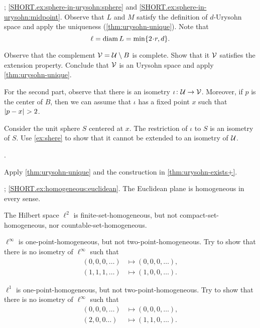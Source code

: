 


\parbf{\ref{ex:sphere-in-urysohn}}; \ref{SHORT.ex:sphere-in-urysohn:sphere} and \ref{SHORT.ex:sphere-in-urysohn:midpoint}.
Observe that $L$ and $M$ satisfy the definition of $d$-Urysohn space and apply the uniqueness (\ref{thm:urysohn-unique}).
Note that
\[\ell=\diam L=\min\{2\cdot r, d\}.\]


Observe that the complement $\mathcal{V}=\mathcal{U}\setminus B$ is complete.
Show that it $\mathcal{V}$ satisfies the extension property.
Conclude that $\mathcal{V}$ is an Urysohn space and apply \ref{thm:urysohn-unique}.

For the second part, observe that there is an isometry $\iota\colon\mathcal{U}\to \mathcal{V}$.
Moreover, if $p$ is the center of $B$, then we can assume that $\iota$ has a fixed point $x$ such that $\dist{p}{x}{}>2$.

Consider the unit sphere $S$ centered at $x$.
The restriction of $\iota$ to $S$ is an isometry of $S$.
Use \ref{ex:shere} to show that it cannot be extended to an isometry of $\mathcal{U}$.

 \cite[Sec. 4.4]{melleray}.

Apply \ref{thm:urysohn-unique} and the construction in \ref{thm:urysohn-exists+}.

\parbf{\ref{ex:homogeneous}}; \ref{SHORT.ex:homogeneous:euclidean}.
The Euclidean plane is homogeneous in every sense.

The Hilbert space $\ell^2$ is finite-set-homogeneous, but not compact-set-homogeneous, nor countable-set-homogeneous.

$\ell^\infty$ is one-point-homogeneous, but not two-point-homogeneous.
Try to show that there is no isometry of $\ell^\infty$ such that
\begin{align*}
(0,0,0,\dots)&\mapsto (0,0,0,\dots),
\\
(1,1,1,\dots)&\mapsto (1,0,0,\dots).
\end{align*}

$\ell^1$ is one-point-homogeneous, but not two-point-homogeneous.
Try to show that there is no isometry of $\ell^\infty$ such that
\begin{align*}
(0,0,0,\dots)&\mapsto (0,0,0,\dots),
\\
(2,0,0\dots)&\mapsto (1,1,0,\dots).
\end{align*}

